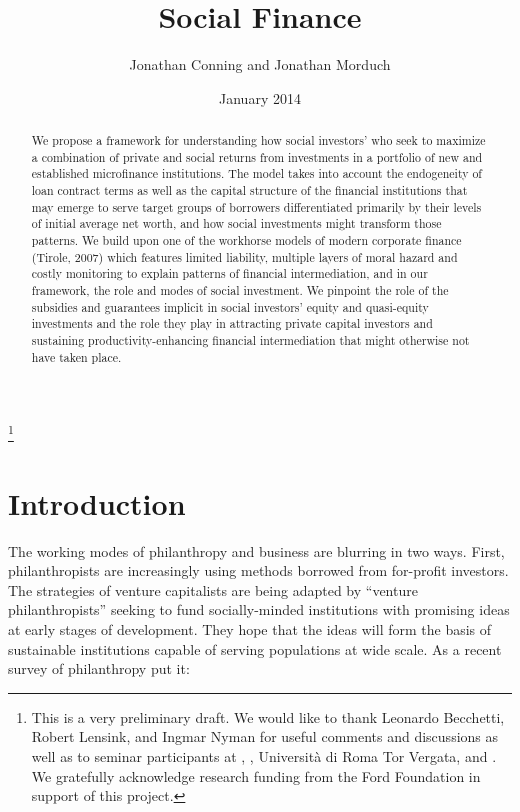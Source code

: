 \documentclass{article}
\begin{document}
\title{Social Finance}
\date{January 2014}
\author{Jonathan Conning and Jonathan Morduch}
\thanks{This is a very preliminary draft. We
  would like to thank Leonardo Becchetti, Robert Lensink, and Ingmar
  Nyman for useful comments and discussions as well as to seminar
  participants at , , Università di Roma Tor Vergata, and . We
  gratefully acknowledge research funding from the Ford Foundation in
  support of this project.}

\maketitle



\begin{abstract} 
We propose a framework for understanding how social
investors' who seek to maximize a combination of private and social
returns from investments in a portfolio of new and established
microfinance institutions. The model takes into account the endogeneity
of loan contract terms as well as the capital structure of the financial
institutions that may emerge to serve target groups of borrowers
differentiated primarily by their levels of initial average net worth,
and how social investments might transform those patterns. We build upon
one of the workhorse models of modern corporate finance (Tirole, 2007)
which features limited liability, multiple layers of moral hazard and
costly monitoring to explain patterns of financial intermediation, and
in our framework, the role and modes of social investment. We pinpoint
the role of the subsidies and guarantees implicit in social investors'
equity and quasi-equity investments and the role they play in attracting
private capital investors and sustaining productivity-enhancing
financial intermediation that might otherwise not have taken place.
\end{abstract}

\section{Introduction}\label{introduction}

The working modes of philanthropy and business are blurring in two ways.
First, philanthropists are increasingly using methods borrowed from
for-profit investors. The strategies of venture capitalists are being
adapted by ``venture philanthropists'' seeking to fund socially-minded
institutions with promising ideas at early stages of development. They
hope that the ideas will form the basis of sustainable institutions
capable of serving populations at wide scale. As a recent survey of
philanthropy put it:
\end{document}
